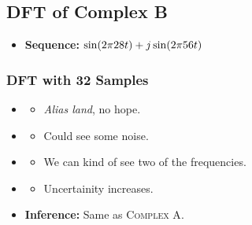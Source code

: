\documentclass[../../course]{subfiles}
\begin{document}
\pagebreak

\subsection{DFT of Complex B} \label{ssec:dtftCplxB}

\begin{itemize} [label=]

    \item \textbf{Sequence:} $\sin(2 \pi 28 t) + j \sin(2 \pi 56 t)$

\end{itemize}

\subsubsection{DFT with 32 Samples}

\begin{itemize} [label=]

    \item \sampFreqMuchLess
        \begin{itemize} [label=]
            \item \emph{Alias land}, no hope.
        \end{itemize}

    \item \sampFreqNorm
        \begin{itemize} [label=]
            \item Could see some noise.
        \end{itemize}

    \item \sampFreqSligGreat
        \begin{itemize} [label=]
            \item We can kind of see two of the frequencies.
        \end{itemize}

    \item \sampFreqMuchGreat
        \begin{itemize} [label=]
            \item Uncertainity increases.
        \end{itemize}

    \item \textbf{Inference:} Same as \textsc{Complex A}.

\end{itemize}

\vfill
\end{document}
